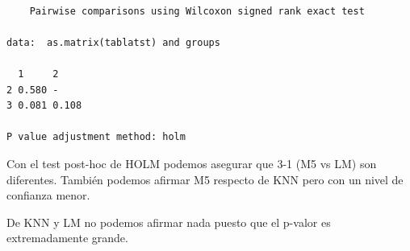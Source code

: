 \begin{verbatim}

    Pairwise comparisons using Wilcoxon signed rank exact test 

data:  as.matrix(tablatst) and groups 

  1     2    
2 0.580 -    
3 0.081 0.108

P value adjustment method: holm 
\end{verbatim}

Con el test post-hoc de HOLM podemos asegurar que 3-1 (M5 vs LM) son diferentes. También podemos afirmar M5 respecto de KNN pero con un nivel de confianza menor.

De KNN y LM no podemos afirmar nada puesto que el p-valor es extremadamente grande.
